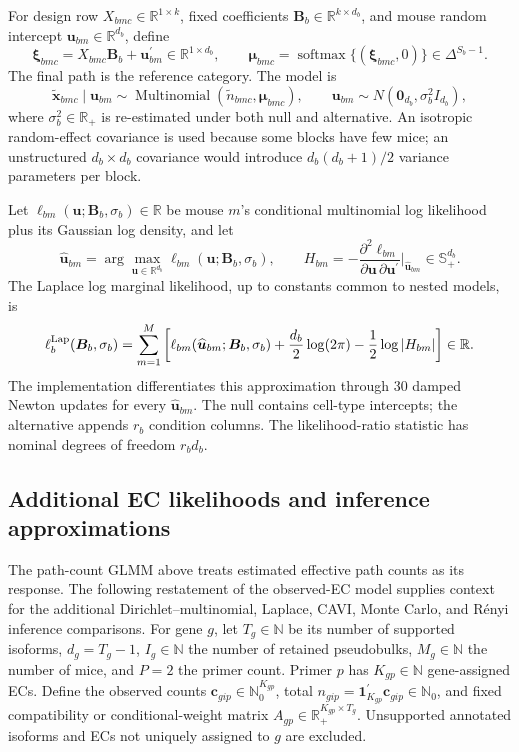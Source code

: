 \documentclass[11pt]{article}
\newcommand{\Beta}{\bm B}
\begin{document}
For design row \(X_{bmc}\in\mathbb R^{1\times k}\), fixed coefficients \(\Beta_b\in\mathbb R^{k\times d_b}\), and mouse random intercept \(\bm u_{bm}\in\mathbb R^{d_b}\), define \[
 \bm\xi_{bmc}=X_{bmc}\Beta_b+\bm u_{bm}^\prime
 \in\mathbb R^{1\times d_b},
\qquad
 \bm\mu_{bmc}=
 \operatorname{softmax}\{(\bm\xi_{bmc},0)\}
 \in\Delta^{S_b-1}.
\]
The final path is the reference category. The model is \[
 \widetilde{\bm x}_{bmc}\mid\bm u_{bm}
 \sim\operatorname{Multinomial}(\widetilde n_{bmc},\bm\mu_{bmc}),
 \qquad
 \bm u_{bm}\sim N(\bm0_{d_b},\sigma_b^2I_{d_b}),
\]
where \(\sigma_b^2\in\mathbb R_+\) is re-estimated under both null and alternative. An isotropic random-effect covariance is used because some blocks have few mice; an unstructured \(d_b\times d_b\) covariance would introduce \(d_b(d_b+1)/2\) variance parameters per block.

Let \(\ell_{bm}(\bm u;\Beta_b,\sigma_b)\in\mathbb R\) be mouse \(m\)'s conditional multinomial log likelihood plus its Gaussian log density, and let \[
 \widehat{\bm u}_{bm}
 =\arg\max_{\bm u\in\mathbb R^{d_b}}\ell_{bm}(\bm u;\Beta_b,\sigma_b),
 \qquad
 H_{bm}=-\frac{\partial^2\ell_{bm}}
 {\partial\bm u\,\partial\bm u^\prime}
 \bigg|_{\widehat{\bm u}_{bm}}\in\mathbb S_+^{d_b}.
\]
The Laplace log marginal likelihood, up to constants common to nested models, is \[
 \ell_b^{\rm Lap}(\Beta_b,\sigma_b)
 =\sum_{m=1}^M\left[
   \ell_{bm}(\widehat{\bm u}_{bm};\Beta_b,\sigma_b)
   +\frac{d_b}{2}\log(2\pi)-\frac12\log|H_{bm}|
 \right]\in\mathbb R.
\]
The implementation differentiates this approximation through 30 damped Newton updates for every \(\widehat{\bm u}_{bm}\). The null contains cell-type intercepts; the alternative appends \(r_b\) condition columns. The likelihood-ratio statistic has nominal degrees of freedom \(r_bd_b\).

\subsection*{Additional EC likelihoods and inference approximations}

The path-count GLMM above treats estimated effective path counts as its response. The following restatement of the observed-EC model supplies context for the additional Dirichlet--multinomial, Laplace, CAVI, Monte Carlo, and R\'enyi inference comparisons. For gene \(g\), let \(T_g\in\mathbb N\) be its number of supported isoforms, \(d_g=T_g-1\), \(I_g\in\mathbb N\) the number of retained pseudobulks, \(M_g\in\mathbb N\) the number of mice, and \(P=2\) the primer count. Primer \(p\) has \(K_{gp}\in\mathbb N\) gene-assigned ECs. Define the observed counts \(\bm c_{gip}\in\mathbb N_0^{K_{gp}}\), total \(n_{gip}=\bm1_{K_{gp}}^\prime\bm c_{gip}\in\mathbb N_0\), and fixed compatibility or conditional-weight matrix \(A_{gp}\in\mathbb R_+^{K_{gp}\times T_g}\). Unsupported annotated isoforms and ECs not uniquely assigned to \(g\) are excluded.
\end{document}
